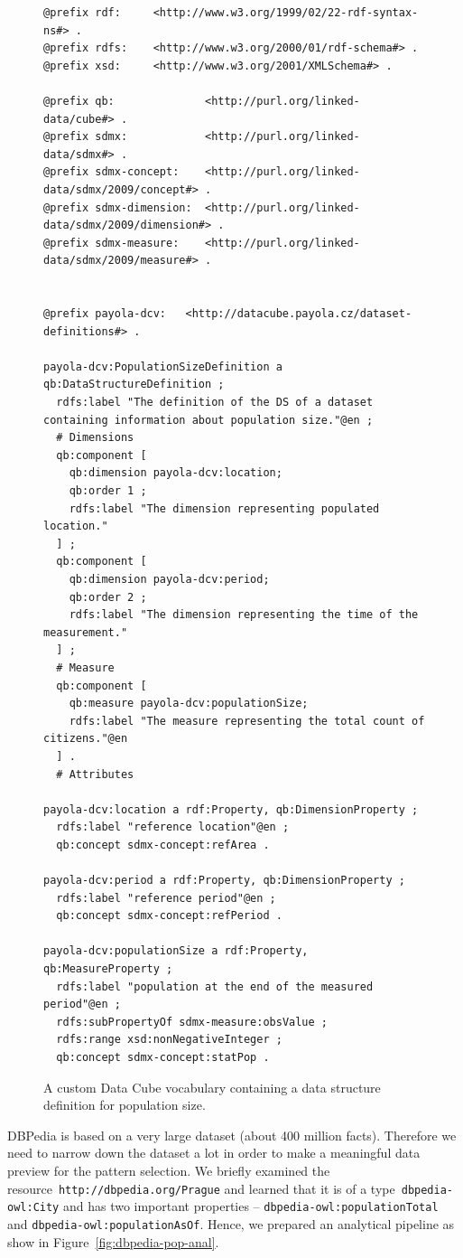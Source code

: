 \begin{figure}
  \scriptsize
  \begin{verbatim}
@prefix rdf:     <http://www.w3.org/1999/02/22-rdf-syntax-ns#> .
@prefix rdfs:    <http://www.w3.org/2000/01/rdf-schema#> .
@prefix xsd:     <http://www.w3.org/2001/XMLSchema#> .

@prefix qb:              <http://purl.org/linked-data/cube#> .
@prefix sdmx:            <http://purl.org/linked-data/sdmx#> .
@prefix sdmx-concept:    <http://purl.org/linked-data/sdmx/2009/concept#> .
@prefix sdmx-dimension:  <http://purl.org/linked-data/sdmx/2009/dimension#> .
@prefix sdmx-measure:    <http://purl.org/linked-data/sdmx/2009/measure#> .


@prefix payola-dcv:   <http://datacube.payola.cz/dataset-definitions#> .

payola-dcv:PopulationSizeDefinition a qb:DataStructureDefinition ;
  rdfs:label "The definition of the DS of a dataset containing information about population size."@en ;
  # Dimensions
  qb:component [
    qb:dimension payola-dcv:location;
    qb:order 1 ;
    rdfs:label "The dimension representing populated location."
  ] ;
  qb:component [	
    qb:dimension payola-dcv:period;
    qb:order 2 ;
    rdfs:label "The dimension representing the time of the measurement."
  ] ;
  # Measure
  qb:component [
    qb:measure payola-dcv:populationSize;
    rdfs:label "The measure representing the total count of citizens."@en
  ] .
  # Attributes

payola-dcv:location a rdf:Property, qb:DimensionProperty ;
  rdfs:label "reference location"@en ;
  qb:concept sdmx-concept:refArea .

payola-dcv:period a rdf:Property, qb:DimensionProperty ;
  rdfs:label "reference period"@en ;
  qb:concept sdmx-concept:refPeriod .

payola-dcv:populationSize a rdf:Property, qb:MeasureProperty ;
  rdfs:label "population at the end of the measured period"@en ;
  rdfs:subPropertyOf sdmx-measure:obsValue ;
  rdfs:range xsd:nonNegativeInteger ;
  qb:concept sdmx-concept:statPop .
  \end{verbatim}
  \label{fig:dcv-dbpedia-dsd}
  \caption{A custom Data Cube vocabulary containing a data structure definition for population size.}
\end{figure}

DBPedia is based on a very large dataset (about 400 million facts). Therefore we 
need to narrow down the dataset a lot in order to make a meaningful data preview for 
the
pattern selection. We briefly examined the resource~\texttt{http://dbpedia.org/Prague} 
and learned that it is of a type~\texttt{dbpedia-owl:City} and has two 
important properties -- \texttt{dbpedia-owl:populationTotal} and 
\texttt{dbpedia-owl:populationAsOf}. Hence, we prepared an analytical pipeline 
as show in Figure~\ref{fig:dbpedia-pop-anal}.

